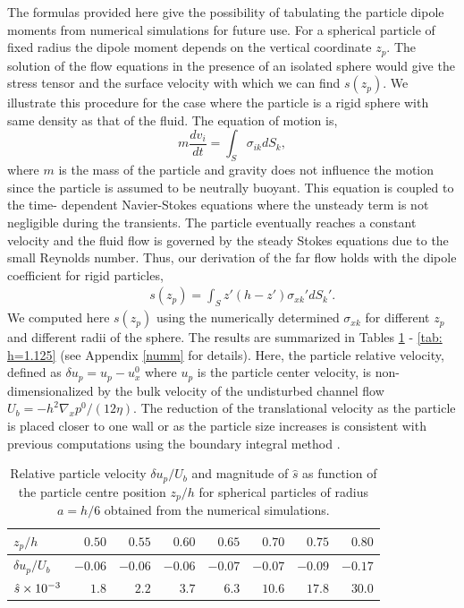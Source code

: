 The formulas provided here give the possibility of tabulating the particle dipole moments from numerical simulations for future use. 
For a spherical particle of fixed radius the dipole moment depends on the vertical coordinate $z_p$. 
The solution of the flow equations in the presence of an isolated sphere would give the stress tensor and the surface velocity 
with which we can find $s(z_p)$. We illustrate this procedure for the case where the particle is a rigid sphere with same density as that of the fluid.
The equation of motion is,
\begin{equation}
    m\frac{dv_i}{dt} =
    \int_{S} \sigma_{ik} dS_k,
\label{eqmp}
\end{equation}
where $m$ is the mass of the particle and gravity does not influence the motion since the particle is assumed to be neutrally buoyant. This equation is coupled to the time-
dependent Navier-Stokes equations where the unsteady
term is not negligible during the transients. 
The particle eventually reaches a constant velocity and the fluid flow is governed by the steady Stokes equations due to the small 
Reynolds number. 
Thus, our derivation of the far flow holds with the dipole coefficient for rigid particles,
\begin{eqnarray}&&\!\!\!\!\!\!\!\!\!\!\!\!\!\!\!\!
s(z_p)=\int_{S}\!\! z'(h\!-\!z') \sigma_{xk}'dS_k'.
\end{eqnarray}
We computed here $s(z_p)$ using the numerically determined $\sigma_{xk}$ for different $z_p$ and different radii of the sphere. The results are summarized in Tables \ref{tab: h=3} - \ref{tab: h=1.125} (see Appendix \ref{numm} for details). Here, the particle relative velocity, defined as $\delta u_p=u_p-u_x^0$ where $u_p$ is the particle center velocity, is non-dimensionalized by the bulk velocity of the undisturbed channel flow $U_b=-h^2\nabla_x p^0/(12\eta)$. 
The reduction of the translational velocity as the particle is placed closer to one wall or as the particle size increases is consistent with previous computations using the 
boundary integral method \citep{bim_1p}.

\begin{table}[t]
 \centering
   \caption{Relative particle velocity $\delta u_p/U_b$ and magnitude of $\hat{s}$ as function of the particle centre position $z_p/h$ for spherical particles of radius $a=h/6$ obtained from the numerical simulations. }%
   \tabulinesep=1.2mm
   \begin{tabular}{l r r r r r r r}
       \hline
       $z_p/h$              &$0.50$   &$0.55$   &$0.60$   &$0.65$   &$0.70$  &$0.75$   &$0.80$\\
       \hline
       $\delta u_p/U_b$     &$-0.06$  &$-0.06$  &$-0.06$  &$-0.07$  &$-0.07$ &$-0.09$  &$-0.17$\\
       $\hat{s} \times 10^{-3}$     &$1.8$    &$2.2$    &$3.7$    &$6.3$    &$10.6$   &$17.8$    &$30.0$\\
       \hline
   \end{tabular}
   \label{tab: h=3}
\end{table}



